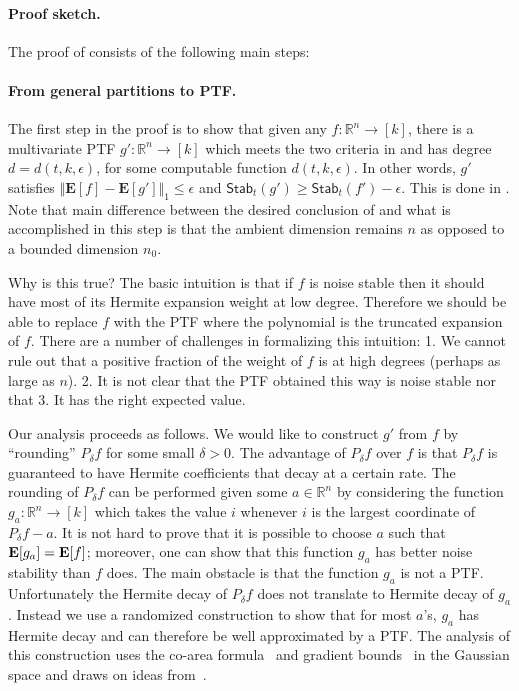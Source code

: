 \documentclass{toc}
\newcommand{\E}{{\bf E}}
\begin{document}
\paragraph{Proof sketch.}
The proof of  consists of the following main steps: 

\paragraph{From general partitions to PTF.} 
The first step in the proof is to show that given any $f: \mathbb{R}^n \rightarrow [k]$, there is a multivariate PTF $g': \mathbb{R}^n \rightarrow [k]$ which meets the two criteria in  and has degree $d= d(t, k, \epsilon)$, for some computable function $d( t, k ,\epsilon)$.  
In other words, $g'$ satisfies $\Vert \mathbf{E}[f] - \mathbf{E}[g'] \Vert_1 \le \epsilon$ and  $\mathsf{Stab}_t(g') \ge \mathsf{Stab}_t(f')  - \epsilon$. 
 This is done in . Note that main difference between the desired conclusion of  and what is accomplished in this step is that the ambient dimension remains $n$ as opposed to a bounded dimension $n_0$. 
 
Why is this true? The basic intuition is that if $f$ is noise stable then it should have most of its Hermite expansion weight at low degree. 
Therefore we should be able to replace $f$ with the PTF where the polynomial is the truncated expansion of $f$. 
There are a number of challenges in formalizing this intuition: 1. We cannot rule out that a positive fraction of the weight of $f$ is at high degrees (perhaps as large as $n$).
2. It is not clear that the PTF obtained this way is noise stable nor that 3. It has the right expected value. 

Our analysis proceeds as follows. We would like to construct $g'$ from $f$ by ``rounding''
$P_\delta f$ for some small $\delta>0$. The advantage of $P_\delta f$ over $f$ is that $P_\delta f$ is guaranteed to have Hermite coefficients that decay at a certain rate.
The rounding of $P_\delta f$ can be performed given some $a \in \mathbb{R}^n$ by considering the function
$g_a: \mathbb{R}^n \to [k]$ which takes the value $i$ whenever $i$ is the largest
coordinate of $P_\delta f - a$. It is not hard to prove that it is possible to choose $a$ such
that $\E[g_a] = \E[f]$; moreover, one can show that this function $g_a$ has better noise
stability than $f$ does. The main obstacle is that the function $g_a$ is not a PTF\@. 
Unfortunately the Hermite decay of $P_\delta f$ does not translate to Hermite decay of $g_a$. 
Instead we use a randomized construction to show that for most $a$'s, $g_a$ has
Hermite decay and can therefore be well approximated by a PTF\@. The
analysis of this construction uses the co-area formula~\cite{federer1969} and gradient
bounds~\cite{Ledoux:94} in the Gaussian space  and draws on ideas from~\cite{Neeman14, KNOW14}.
\end{document}
